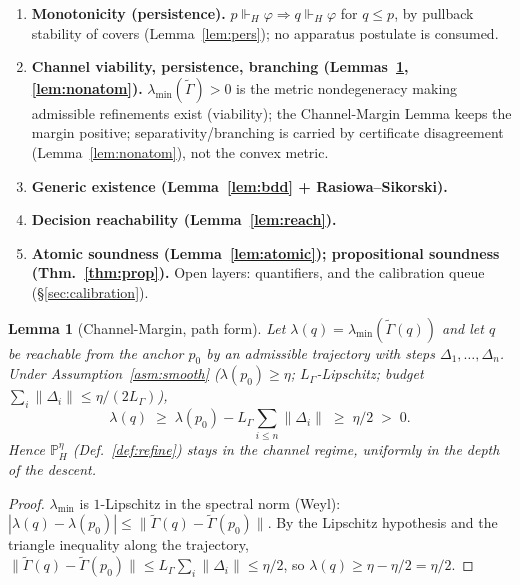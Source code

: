 \documentclass[11pt]{article}
\newtheorem{lemma}{Lemma}
\theoremstyle{definition}
\theoremstyle{remark}
\newcommand{\forcesH}{\Vdash_{H}}
\newcommand{\PHeta}{\mathbb{P}_{H}^{\eta}}
\newcommand{\refines}{\leq}
\newcommand{\Gam}{\tilde{\Gamma}}
\newcommand{\lmin}{\lambda_{\min}}
\begin{document}
\begin{enumerate}[leftmargin=1.6em]
\item \textbf{Monotonicity (persistence).} $p\forcesH\varphi\Rightarrow q\forcesH\varphi$ for
  $q\refines p$, by pullback stability of covers (Lemma~\ref{lem:pers}); no apparatus postulate is
  consumed.
\item \textbf{Channel viability, persistence, branching (Lemmas~\ref{lem:margin}, \ref{lem:nonatom}).}
  $\lmin(\Gam)>0$ is the metric nondegeneracy making admissible refinements exist (viability); the
  Channel-Margin Lemma keeps the margin positive; separativity/branching is carried by certificate
  disagreement (Lemma~\ref{lem:nonatom}), not the convex metric.
\item \textbf{Generic existence (Lemma~\ref{lem:bdd} + Rasiowa--Sikorski).}
\item \textbf{Decision reachability (Lemma~\ref{lem:reach}).}
\item \textbf{Atomic soundness (Lemma~\ref{lem:atomic}); propositional soundness (Thm.~\ref{thm:prop}).}
  Open layers: quantifiers, and the calibration queue (\S\ref{sec:calibration}).
\end{enumerate}

\begin{lemma}[Channel-Margin, path form]\label{lem:margin}
Let $\lambda(q)=\lmin(\Gam(q))$ and let $q$ be reachable from the anchor $p_0$ by an admissible
trajectory with steps $\Delta_1,\dots,\Delta_n$. Under Assumption~\ref{asm:smooth}
($\lambda(p_0)\ge\eta$; $L_\Gamma$-Lipschitz; budget $\sum_i\|\Delta_i\|\le\eta/(2L_\Gamma)$),
\[
  \lambda(q)\;\ge\;\lambda(p_0)-L_\Gamma\sum_{i\le n}\|\Delta_i\|\;\ge\;\eta/2\;>\;0 .
\]
Hence $\PHeta$ (Def.~\ref{def:refine}) stays in the channel regime, uniformly in the depth of the
descent.
\end{lemma}

\begin{proof}
$\lmin$ is $1$-Lipschitz in the spectral norm (Weyl): $|\lambda(q)-\lambda(p_0)|\le\|\Gam(q)-\Gam(p_0)\|$.
By the Lipschitz hypothesis and the triangle inequality along the trajectory,
$\|\Gam(q)-\Gam(p_0)\|\le L_\Gamma\sum_i\|\Delta_i\|\le\eta/2$, so
$\lambda(q)\ge\eta-\eta/2=\eta/2$.
\end{proof}
\end{document}
